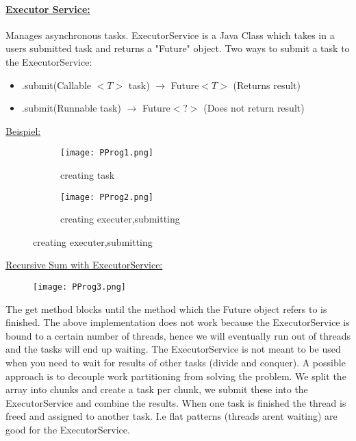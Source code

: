 \documentclass[8pt]{extreport}
\begin{document}
\paragraph{\underline{Executor Service:}} Manages asynchronous tasks. ExecutorService is a Java Class which takes in a users submitted task and returns a "Future" object. Two ways to submit a task to the ExecutorService:
\begin{itemize}
\item .submit(Callable $<T>$ task) $\rightarrow$ Future$<T>$  (Returns result)
\item .submit(Runnable task) $\rightarrow$ Future$<?>$ 	(Does not return result)
\end{itemize} 
\underline{Beispiel:}
\begin{figure}[h!]
	\centering
	\begin{subfigure}[b]{0.49\linewidth}
	\texttt{[image: PProg1.png]}
	\caption{creating task}
	\label{PProg1}
	\end{subfigure}
	\begin{subfigure}[b]{0.49\linewidth}
	\texttt{[image: PProg2.png]}
	\caption{creating executer,submitting}
	\label{PProg2}
	\end{subfigure}
\end{figure}
\newline
\underline{Recursive Sum with ExecutorService:}
\begin{figure}[h!]
	\centering\texttt{[image: PProg3.png]}
	\caption{}
	\label{PProg3}
\end{figure}
\newline
The get method blocks until the method which the Future object refers to is finished. The above implementation does not work because the ExecutorService is bound to a certain number of threads, hence we will eventually run out of threads and the tasks will end up waiting. The ExecutorService is not meant to be used when you need to wait for results of other tasks (divide and conquer). A possible approach is to decouple work partitioning from solving the problem. We split the array into chunks and create a task per chunk, we submit these into the ExecutorService and combine the results. When one task is finished the thread is freed and assigned to another task. I.e flat patterns (threads arent waiting) are good for the ExecutorService.
\end{document}
